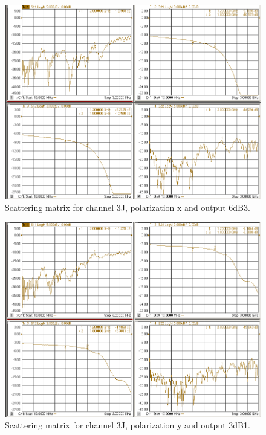 \documentclass[12pt,a4paper,oneside]{article}
\begin{document}
\begin{figure}[H]
\centering
\includegraphics[width=0.9\linewidth]{VNA_results/3Jx_6dB3.png}
\caption{Scattering matrix for channel 3J, polarization x and output 6dB3.}
\label{fig:3Jx_6dB3}
\end{figure}


\begin{figure}[H]
\centering
\includegraphics[width=0.9\linewidth]{VNA_results/3Jy_3dB1.png}
\caption{Scattering matrix for channel 3J, polarization y and output 3dB1.}
\label{fig:3Jy_3dB1}
\end{figure}
\end{document}

